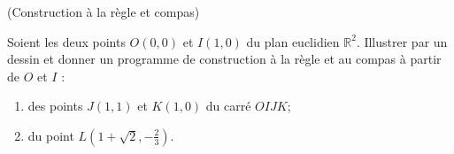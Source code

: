 \documentclass[a4paper,12pt,reqno]{amsart}
\begin{document}

\begin{exo} (Construction à la règle et compas)

  Soient les deux points $O(0,0)$ et $I(1,0)$ du plan euclidien $\mathbb{R}^2$. Illustrer par un dessin et donner un programme de construction à la règle et au compas à partir de $O$ et $I$ :
  \begin{enumerate}
    \item des points $J(1,1)$ et $K(1,0)$ du carré $OIJK$;
    \item du point $L(1+\sqrt{2},-\frac{2}{3})$.
  \end{enumerate}
\end{exo}
\end{document}

